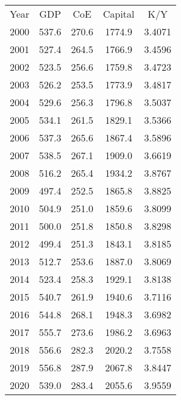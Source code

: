 \begin{table}[htbp]
\centering
\begin{tabular}{ccccc}
Year & GDP & CoE & Capital & K/Y \\
2000 & 537.6 & 270.6 & 1774.9 & 3.4071 \\
2001 & 527.4 & 264.5 & 1766.9 & 3.4596 \\
2002 & 523.5 & 256.6 & 1759.8 & 3.4723 \\
2003 & 526.2 & 253.5 & 1773.9 & 3.4817 \\
2004 & 529.6 & 256.3 & 1796.8 & 3.5037 \\
2005 & 534.1 & 261.5 & 1829.1 & 3.5366 \\
2006 & 537.3 & 265.6 & 1867.4 & 3.5896 \\
2007 & 538.5 & 267.1 & 1909.0 & 3.6619 \\
2008 & 516.2 & 265.4 & 1934.2 & 3.8767 \\
2009 & 497.4 & 252.5 & 1865.8 & 3.8825 \\
2010 & 504.9 & 251.0 & 1859.6 & 3.8099 \\
2011 & 500.0 & 251.8 & 1850.8 & 3.8298 \\
2012 & 499.4 & 251.3 & 1843.1 & 3.8185 \\
2013 & 512.7 & 253.6 & 1887.0 & 3.8069 \\
2014 & 523.4 & 258.3 & 1929.1 & 3.8138 \\
2015 & 540.7 & 261.9 & 1940.6 & 3.7116 \\
2016 & 544.8 & 268.1 & 1948.3 & 3.6982 \\
2017 & 555.7 & 273.6 & 1986.2 & 3.6963 \\
2018 & 556.6 & 282.3 & 2020.2 & 3.7558 \\
2019 & 556.8 & 287.9 & 2067.8 & 3.8447 \\
2020 & 539.0 & 283.4 & 2055.6 & 3.9559 \\
\end{tabular}
\end{table}